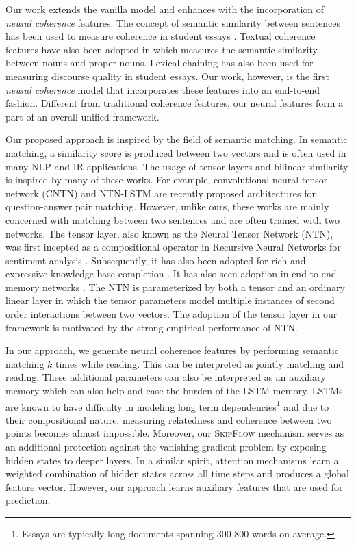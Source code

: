 \documentclass[letterpaper]{article}
\begin{document}
Our work extends the vanilla model and enhances with the incorporation of \textit{neural coherence} features. The concept of semantic similarity between sentences has been used to measure coherence in student essays \cite{higgins2007sentence,higgins2004evaluating}. Textual coherence features have also been adopted in \cite{DBLP:conf/emnlp/ChenH13} which measures the semantic similarity between nouns and proper nouns. Lexical chaining \cite{somasundaran2014lexical} has also been used for measuring discourse quality in student essays. Our work, however, is the first \textit{neural coherence} model that incorporates these features into an end-to-end fashion. Different from traditional coherence features, our neural features form a part of an overall unified framework.

Our proposed approach is inspired by the field of semantic matching. In semantic matching, a similarity score is produced between two vectors and is often used in many NLP and IR applications. The usage of tensor layers and bilinear similarity is inspired by many of these works. For example, convolutional neural tensor network (CNTN) \cite{DBLP:conf/ijcai/QiuH15} and NTN-LSTM \cite{DBLP:conf/sigir/TayPLH17} are recently proposed architectures for question-answer pair matching. However, unlike ours, these works are mainly concerned with matching between two sentences and are often trained with two networks. The tensor layer, also known as the Neural Tensor Network (NTN), was first incepted as a compositional operator in Recursive Neural Networks for sentiment analysis \cite{socher2013recursive}. Subsequently, it has also been adopted for rich and expressive knowledge base completion \cite{DBLP:conf/nips/SocherCMN13}. It has also seen adoption in end-to-end memory networks \cite{DBLP:conf/cikm/TayTH17}. The NTN is parameterized by both a tensor and an ordinary linear layer in which the tensor parameters model multiple instances of second order interactions between two vectors. The adoption of the tensor layer in our framework is motivated by the strong empirical performance of NTN.


In our approach, we generate neural coherence features by performing semantic matching $k$ times while reading. This can be interpreted as jointly matching and reading. These additional parameters can also be interpreted as an auxiliary memory which can also help and ease the burden of the LSTM memory. LSTMs are known to have difficulty in modeling long term dependencies\footnote{Essays are typically long documents spanning 300-800 words on average.} and due to their compositional nature, measuring relatedness and coherence between two points becomes almost impossible. Moreover, our \textsc{SkipFlow} mechanism serves as an additional protection against the vanishing gradient problem by exposing hidden states to deeper layers. In a similar spirit, attention mechanisms \cite{bahdanau2014neural} learn a weighted combination of hidden states across all time steps and produces a global feature vector. However, our approach learns auxiliary features that are used for prediction. 
\end{document}
